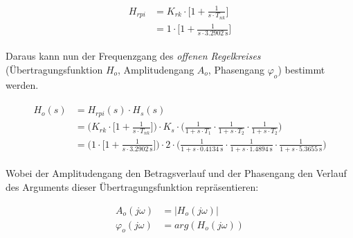 \begin{gather} \label{eq:pi:target}
    \begin{split}
        H_{rpi} & = K_{rk} \cdot \Big[ 1 + \frac{1}{s \cdot T_{nk}} \Big] \\
                & = 1      \cdot \Big[ 1 + \frac{1}{s \cdot \SI{3.2902}{\second}} \Big]
    \end{split}
\end{gather}

Daraus   kann   nun   der   Frequenzgang   des   {\em{offenen   Regelkreises}}
(\"Ubertragungsfunktion $H_o$,  Amplitudengang $A_o$,  Phasengang $\varphi_o$)
bestimmt werden.

\begin{gather} \label{eq:pi:h_open}
    \begin{split}
        H_o (s) & = H_{rpi} (s) \cdot H_s (s) \\
            & = \bigg(
                    K_{rk} \cdot \Big[ 1 + \frac{1}{s \cdot T_{nk}} \Big]
                \bigg)
                \cdot
                K_s
                \cdot
                \bigg(
                        \frac{1}{1 + s \cdot T_1}
                  \cdot \frac{1}{1 + s \cdot T_2}
                  \cdot \frac{1}{1 + s \cdot T_2}
                \bigg) \\
            & = \bigg(
                    1 \cdot \Big[ 1 + \frac{1}{s \cdot \SI{3.2902}{\second}} \Big]
                \bigg)
                \cdot
                2
                \cdot
                \bigg(
                          \frac{1}{1 + s \cdot \SI{0.4134}{\second}}
                    \cdot \frac{1}{1 + s \cdot \SI{1.4894}{\second}}
                    \cdot \frac{1}{1 + s \cdot \SI{5.3655}{\second}}
                \bigg)
    \end{split}
\end{gather}


Wobei der Amplitudengang den Betragsverlauf und der Phasengang den Verlauf des
Arguments dieser \"Ubertragungsfunktion repr\"asentieren:

\begin{equation}
    \begin{split} \label{eq:pi:a_o_phi_o}
        A_o(j\omega)       & = |H_o(j\omega)| \\
        \varphi_o(j\omega) & = arg(H_o(j\omega))
    \end{split}
\end{equation}

